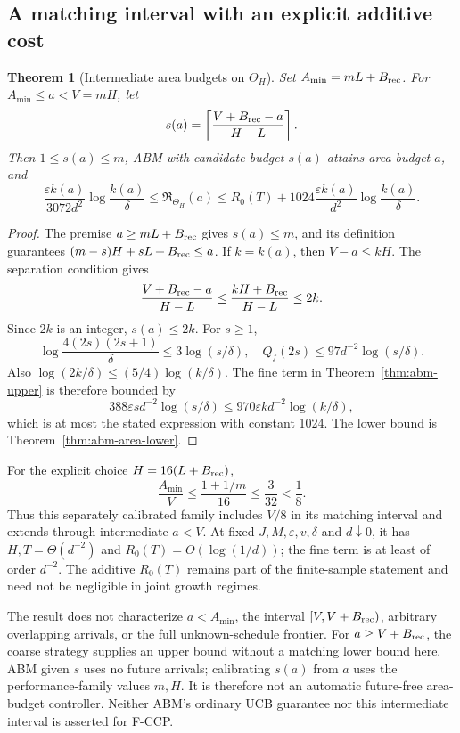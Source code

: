 \documentclass[11pt]{article}
\newtheorem{theorem}{Theorem}[section]
\theoremstyle{remark}
\begin{document}
\subsection{A matching interval with an explicit additive cost}

\begin{theorem}[Intermediate area budgets on $\Theta_H$]
\label{thm:abm-intermediate}
Set $A_{\min}=mL+B_{\rm rec}$. For
$A_{\min}\le a<V=mH$, let
\[
 s(a)=\left\lceil\frac{V+B_{\rm rec}-a}{H-L}\right\rceil.
\]
Then $1\le s(a)\le m$, ABM with candidate budget $s(a)$ attains area
budget $a$, and
\[
 \frac{\varepsilon k(a)}{3072d^2}\log\frac{k(a)}\delta
 \le\mathfrak R_{\Theta_H}(a)
 \le R_0(T)+1024\frac{\varepsilon k(a)}{d^2}
                                \log\frac{k(a)}\delta.
\]
\end{theorem}
\begin{proof}
The premise $a\ge mL+B_{\rm rec}$ gives $s(a)\le m$, and its
definition guarantees
$(m-s)H+sL+B_{\rm rec}\le a$. If $k=k(a)$, then $V-a\le kH$.
The separation condition gives
\[
 \frac{V+B_{\rm rec}-a}{H-L}
       \le\frac{kH+B_{\rm rec}}{H-L}\le2k.
\]
Since $2k$ is an integer, $s(a)\le2k$. For $s\ge1$,
\[
 \log\frac{4(2s)(2s+1)}\delta\le3\log(s/\delta),
 \quad Q_f(2s)\le97d^{-2}\log(s/\delta).
\]
Also $\log(2k/\delta)\le(5/4)\log(k/\delta)$. The fine term in
Theorem~\ref{thm:abm-upper} is therefore bounded by
\[
 388\varepsilon s d^{-2}\log(s/\delta)
       \le970\varepsilon k d^{-2}\log(k/\delta),
\]
which is at most the stated expression with constant 1024. The lower
bound is Theorem~\ref{thm:abm-area-lower}.
\end{proof}

For the explicit choice $H=16(L+B_{\rm rec})$,
\[
 \frac{A_{\min}}V\le\frac{1+1/m}{16}\le\frac3{32}<\frac18.
\]
Thus this separately calibrated family includes $V/8$ in its matching
interval and extends through intermediate $a<V$. At fixed
$J,M,\varepsilon,v,\delta$ and $d\downarrow0$, it has
$H,T=\Theta(d^{-2})$ and $R_0(T)=O(\log(1/d))$; the fine term is at
least of order $d^{-2}$. The additive $R_0(T)$ remains part of the
finite-sample statement and need not be negligible in joint growth
regimes.

The result does not characterize $a<A_{\min}$, the interval
$[V,V+B_{\rm rec})$, arbitrary overlapping arrivals, or the full
unknown-schedule frontier. For $a\ge V+B_{\rm rec}$, the coarse
strategy supplies an upper bound without a matching lower bound here.
ABM given $s$ uses no future arrivals; calibrating $s(a)$ from $a$
uses the performance-family values $m,H$. It is therefore not an
automatic future-free area-budget controller. Neither ABM's ordinary
UCB guarantee nor this intermediate interval is asserted for F-CCP.
\end{document}
